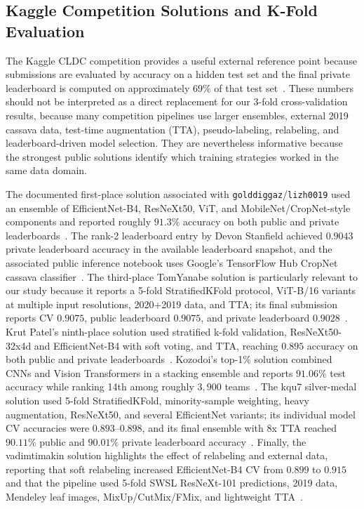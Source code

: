 \documentclass[conference]{IEEEtran}
\begin{document}
\subsection{Kaggle Competition Solutions and K-Fold Evaluation}
The Kaggle CLDC competition provides a useful external reference point because submissions are evaluated by accuracy on a hidden test set and the final private leaderboard is computed on approximately $69\%$ of that test set~\cite{kaggle2020leaderboard}. These numbers should not be interpreted as a direct replacement for our 3-fold cross-validation results, because many competition pipelines use larger ensembles, external 2019 cassava data, test-time augmentation (TTA), pseudo-labeling, relabeling, and leaderboard-driven model selection. They are nevertheless informative because the strongest public solutions identify which training strategies worked in the same data domain.

The documented first-place solution associated with \texttt{golddiggaz}/\texttt{lizh0019} used an ensemble of EfficientNet-B4, ResNeXt50, ViT, and MobileNet/CropNet-style components and reported roughly $91.3\%$ accuracy on both public and private leaderboards~\cite{lizh0019cassava}. The rank-2 leaderboard entry by Devon Stanfield achieved $0.9043$ private leaderboard accuracy in the available leaderboard snapshot, and the associated public inference notebook uses Google's TensorFlow Hub CropNet cassava classifier~\cite{devonstanfield2021cassava}. The third-place TomYanabe solution is particularly relevant to our study because it reports a 5-fold StratifiedKFold protocol, ViT-B/16 variants at multiple input resolutions, 2020+2019 data, and TTA; its final submission reports CV $0.9075$, public leaderboard $0.9075$, and private leaderboard $0.9028$~\cite{tomyanabe2021cassava}. Krut Patel's ninth-place solution used stratified k-fold validation, ResNeXt50-32x4d and EfficientNet-B4 with soft voting, and TTA, reaching $0.895$ accuracy on both public and private leaderboards~\cite{krutpatel2021cassava}. Kozodoi's top-1\% solution combined CNNs and Vision Transformers in a stacking ensemble and reports $91.06\%$ test accuracy while ranking 14th among roughly $3{,}900$ teams~\cite{kozodoi2021cassava}. The kqu7 silver-medal solution used 5-fold StratifiedKFold, minority-sample weighting, heavy augmentation, ResNeXt50, and several EfficientNet variants; its individual model CV accuracies were $0.893$--$0.898$, and its final ensemble with 8x TTA reached $90.11\%$ public and $90.01\%$ private leaderboard accuracy~\cite{kqu7cassava}. Finally, the vadimtimakin solution highlights the effect of relabeling and external data, reporting that soft relabeling increased EfficientNet-B4 CV from $0.899$ to $0.915$ and that the pipeline used 5-fold SWSL ResNeXt-101 predictions, 2019 data, Mendeley leaf images, MixUp/CutMix/FMix, and lightweight TTA~\cite{vadimtimakin2021cassava}.
\end{document}
